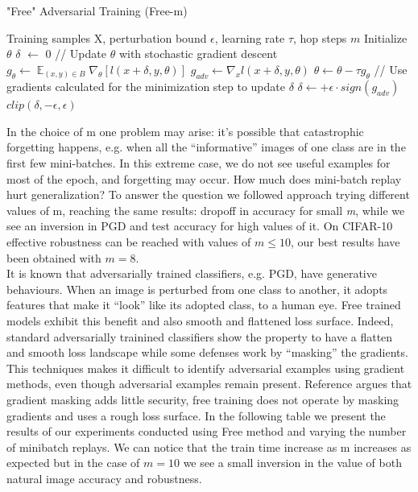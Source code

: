 \documentclass{article}
\DeclareMathOperator{\EX}{\mathbb{E}}%
\begin{document}
\begin{algorithm}[H]
	\caption{"Free" Adversarial Training (Free-m)}
	\begin{algorithmic}[1]
		\Require Training samples X, perturbation bound $\epsilon$, learning rate $\tau$, hop steps $m$
		\State Initialize $\theta$
		\State $\delta$ $\leftarrow$ 0
		\State // Update $\theta$ with stochastic gradient descent
		\State $g_{\theta} \leftarrow \EX_{(x,y) \in B} \nabla_{\theta} [l(x+\delta, y, \theta)]$
		\State $g_{adv} \leftarrow \nabla_{x} l(x+\delta, y, \theta)$
		\State $\theta \leftarrow \theta - \tau g_{\theta}$
		\State // Use gradients calculated for the minimization step to update $\delta$
		\State $\delta \leftarrow + \epsilon \cdot sign(g_{adv})$
		\State $clip(\delta, -\epsilon, \epsilon)$
		\EndFor
		\EndFor
		\EndFor
	\end{algorithmic}
\end{algorithm}
In the choice of m one problem may arise:
it's possible that catastrophic forgetting happens, e.g. when all the “informative” images of one class are in the first few mini-batches. In this extreme case, we do not see useful examples for most of the epoch, and forgetting may occur.
How much does mini-batch replay hurt generalization?
To answer the question we followed \cite{ShafahiEtAl2019b} approach trying different values of m, reaching the same results: dropoff in accuracy for small \textit{m}, while we see an inversion in PGD and test accuracy for high values of it. On CIFAR-10 effective robustness can be reached with values of $m \leq 10$, our best results have been obtained with $m = 8$.\\
It is known that adversarially trained classifiers, e.g. PGD,  have generative behaviours. When an image is perturbed from one class to another, it adopts features that make it “look” like its adopted class, to a human eye.
Free trained models exhibit this benefit and also smooth and flattened loss surface.
Indeed, standard adversarially trainined classifiers show the property to have a flatten and smooth loss landscape while some defenses work by “masking” the gradients. This techniques makes it difficult to identify
adversarial examples using gradient methods, even though adversarial examples remain present.
Reference \cite{EngstromEtAl2018} argues that gradient masking adds little security, free training does not operate by masking gradients and uses a rough loss surface.
In the following table we present the results of our experiments conducted using Free method and varying the number of minibatch replays. We can notice that the train time increase as m increases as expected but in the case of $m=10$ we see a small inversion in the value of both natural image accuracy and robustness.\\
\end{document}
